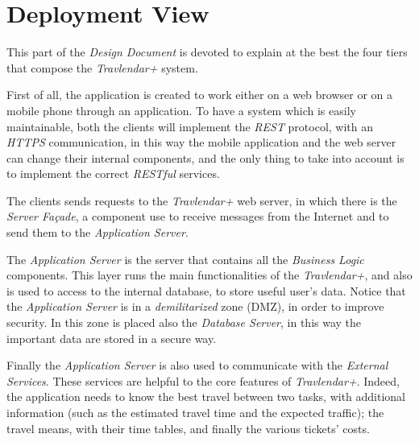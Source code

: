 \section{Deployment View}
This part of the \emph{Design Document} is devoted to explain at the best the four tiers that compose the \emph{Travlendar+} system.

First of all, the application is created to work either on a web browser or on a mobile phone through an application.
To have a system which is easily maintainable, both the clients will implement the \emph{REST} protocol, with an \emph{HTTPS} communication, in this way the mobile application and the web server can change their internal components, and the only thing to take into account is to implement the correct \emph{RESTful} services.

The clients sends requests to the \emph{Travlendar+} web server, in which there is the \emph{Server Façade}, a component use to receive messages from the Internet and to send them to the \emph{Application Server}.

The \emph{Application Server} is the server that contains all the \emph{Business Logic} components. This layer runs the main functionalities of the \emph{Travlendar+}, and also is used to access to the internal database, to store useful user's data. Notice that the \emph{Application Server} is in a \emph{demilitarized} zone (DMZ), in order to improve security. In this zone is placed also the \emph{Database Server}, in this way the important data are stored in a secure way.

Finally the \emph{Application Server} is also used to communicate with the \emph{External Services}. These services are helpful to the core features of \emph{Travlendar+}. Indeed, the application needs to know the best travel between two tasks, with additional information (such as the estimated travel time and the expected traffic); the travel means, with their time tables, and finally the various tickets' costs.

